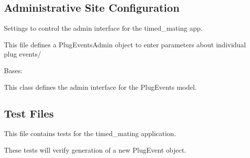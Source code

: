 \documentclass[letterpaper,10pt,english]{sphinxmanual}
\begin{document}
\begin{fulllineitems}
\label{api:timed_mating.urls.limited_object_list}
\end{fulllineitems}



\subsection{Administrative Site Configuration}
\label{api:id9}\label{api:module-timed_mating.admin}
Settings to control the admin interface for the timed\_mating app.

This file defines a PlugEventsAdmin object to enter parameters about individual plug events/

\begin{fulllineitems}
\label{api:timed_mating.admin.PlugEventsAdmin}
Bases: 

This class defines the admin interface for the PlugEvents model.

\begin{fulllineitems}
\label{api:timed_mating.admin.PlugEventsAdmin.media}
\end{fulllineitems}


\end{fulllineitems}



\subsection{Test Files}
\label{api:id10}\label{api:module-timed_mating.tests}
This file contains tests for the timed\_mating application.

These tests will verify generation of a new PlugEvent object.
\end{document}
